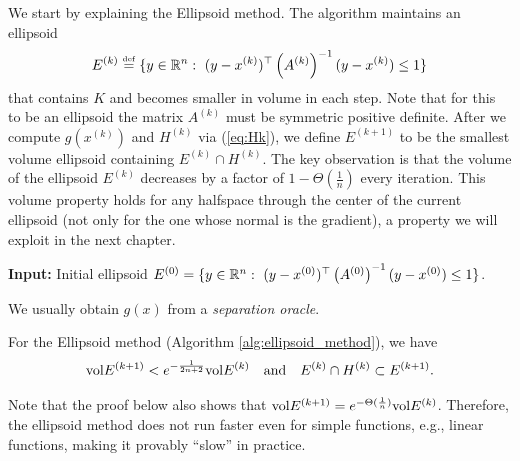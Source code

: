 We start by explaining the Ellipsoid method. The algorithm maintains
an ellipsoid
\[
E^{(k)}\defeq\{y\in\Rn:\ (y-x^{(k)})^{\top}\left(A^{(k)}\right)^{-1}(y-x^{(k)})\leq1\}
\]
that contains $K$ and becomes smaller in volume in each step. Note
that for this to be an ellipsoid the matrix $A^{(k)}$ must be symmetric
positive definite. After we compute $g(x^{(k)})$ and $H^{(k)}$ via
(\ref{eq:Hk}), we define $E^{(k+1)}$ to be the smallest volume ellipsoid
containing $E^{(k)}\cap H^{(k)}$. The key observation is that the
volume of the ellipsoid $E^{(k)}$ decreases by a factor of $1-\Theta(\frac{1}{n})$
every iteration. This volume property holds for any halfspace through
the center of the current ellipsoid (not only for the one whose normal
is the gradient), a property we will exploit in the next chapter.

\begin{algorithm2e}[H]

\caption{$\mathtt{Ellipsoid}$}\label{alg:ellipsoid_method}

\SetAlgoLined

\textbf{Input:} Initial ellipsoid $E^{(0)}=\{y\in\Rn:\ (y-x^{(0)})^{\top}\left(A^{(0)}\right)^{-1}(y-x^{(0)})\leq1\}$.


\end{algorithm2e}
\begin{rem}
We usually obtain $g(x)$ from a \emph{separation oracle}.
\end{rem}

\begin{lem}
\label{lem:ellipsoid_vol_decrease}For the Ellipsoid method (Algorithm
\ref{alg:ellipsoid_method}), we have 
\[
\mathrm{vol} E^{(k+1)}<e^{-\frac{1}{2n+2}}\mathrm{vol} E^{(k)}\quad\mbox{and}\quad E^{(k)}\cap H^{(k)}\subset E^{(k+1)}.
\]
\end{lem}

\begin{rem}
Note that the proof below also shows that $\mathrm{vol} E^{(k+1)}=e^{-\Theta(\frac{1}{n})}\mathrm{vol} E^{(k)}$.
Therefore, the ellipsoid method does not run faster even for simple
functions, e.g., linear functions, making it provably ``slow'' in
practice.
\end{rem}

